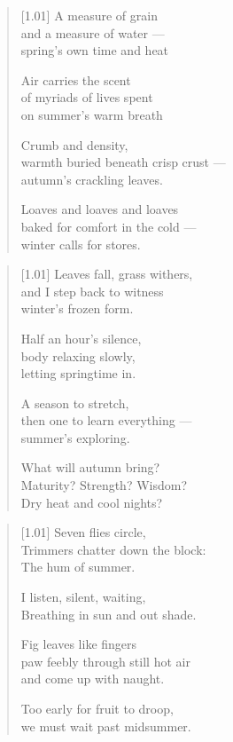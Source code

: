 

\null
\vfill

\begin{verse}[1.01\textwidth]
  A measure of grain\\
  and a measure of water ---\\
  spring's own time and heat

  Air carries the scent\\
  of myriads of lives spent\\
  on summer's warm breath

  Crumb and density,\\
  warmth buried beneath crisp crust ---\\
  autumn's crackling leaves.

  Loaves and loaves and loaves\\
  baked for comfort in the cold ---\\
  winter calls for stores.
\end{verse}

\vfill

\newpage

\null
\vfill

\begin{verse}[1.01\textwidth]
  Leaves fall, grass withers,\\
  and I step back to witness\\
  winter's frozen form.

  Half an hour's silence,\\
  body relaxing slowly,\\
  letting springtime in.

  A season to stretch,\\
  then one to learn everything ---\\
  summer's exploring.

  What will autumn bring?\\
  Maturity? Strength? Wisdom?\\
  Dry heat and cool nights?
\end{verse}

\vfill

\newpage

\null
\vfill

\begin{verse}[1.01\textwidth]
    Seven flies circle,\\
    Trimmers chatter down the block:\\
    The hum of summer.

    \vin I listen, silent, waiting,\\
    \vin Breathing in sun and out shade.

    Fig leaves like fingers\\
    paw feebly through still hot air\\
    and come up with naught.

    \vin Too early for fruit to droop,\\
    \vin we must wait past midsummer.
  \end{verse}

